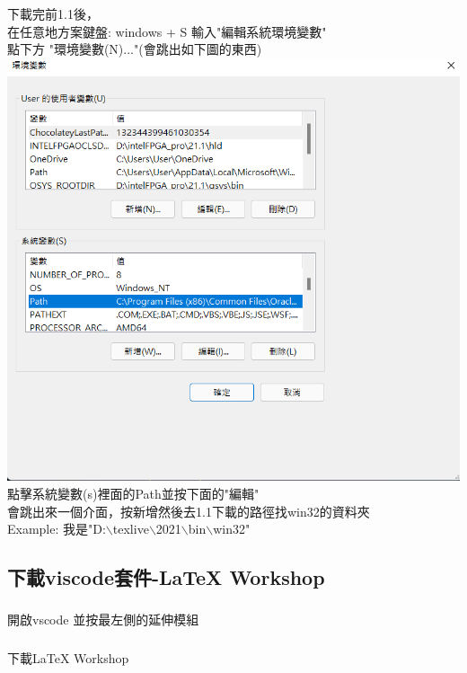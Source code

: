 \documentclass[12pt]{article}
\begin{document}
\begin{CJK*}{UTF8}{bsmi}
    \subsubsection{}
    下載完前1.1後，\\
    在任意地方案鍵盤: windows + S 輸入"編輯系統環境變數"\\
    點下方 "環境變數(N)..."(會跳出如下圖的東西)\\
    \includegraphics[width=6in]{teaching.png}\\
    點擊系統變數(s)裡面的Path並按下面的"編輯"\\
    會跳出來一個介面，按新增然後去1.1下載的路徑找win32的資料夾\\
    Example: 我是"D:$\backslash$texlive$\backslash$2021$\backslash$bin$\backslash$win32"
    \subsection{下載viscode套件-LaTeX Workshop}
    \subsubsection{}
    開啟vscode 並按最左側的延伸模組
    \subsubsection{}
    下載LaTeX Workshop
    \newpage

\end{CJK*}
\end{document}
